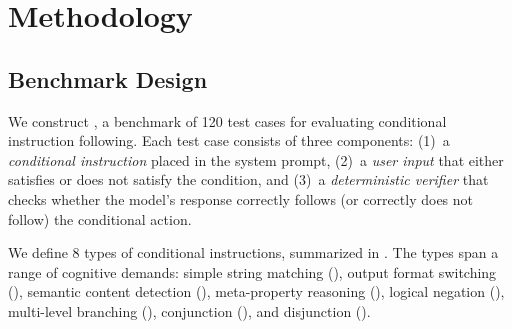 \section{Methodology}
\label{sec:method}

\subsection{Benchmark Design}
\label{sec:benchmark}

We construct \benchname, a benchmark of 120 test cases for evaluating conditional instruction following. Each test case consists of three components: (1)~a \emph{conditional instruction} placed in the system prompt, (2)~a \emph{user input} that either satisfies or does not satisfy the condition, and (3)~a \emph{deterministic verifier} that checks whether the model's response correctly follows (or correctly does not follow) the conditional action.

We define 8 types of conditional instructions, summarized in . The types span a range of cognitive demands: simple string matching (), output format switching (), semantic content detection (), meta-property reasoning (), logical negation (), multi-level branching (), conjunction (), and disjunction ().

